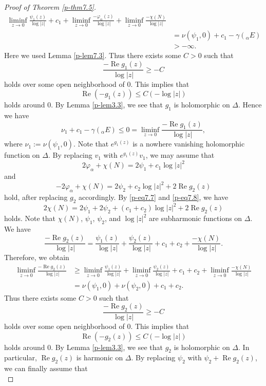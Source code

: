\documentclass[12pt,twoside]{amsart}
\DeclareMathOperator{\re}{Re}
\theoremstyle{definition}
\begin{document}
\begin{proof}[Proof of Theorem \ref{p-thm7.5}]
\[\begin{split}
\liminf_{z\to 0}\frac{\psi_1(z)}{\log |z|}
+c_1+\liminf_{z\to 0}\frac{-\varphi_\alpha(z)}{\log|z|}
+\liminf_{z\to 0}\frac{-\chi(N)}{\log|z|}
\\ &=\nu(\psi_1, 0)+c_1-\gamma({}_\alpha E) \\ 
&>-\infty. 
\end{split}
\] 
Here we used Lemma \ref{p-lem7.3}. 
Thus there exists some $C>0$ such that 
\[
\frac{-\re g_1(z)}{\log |z|}\geq -C
\] 
holds over some open neighborhood of $0$. 
This implies that 
\[
\re\left(-g_1(z)\right)\leq C\left(-\log |z|\right)
\] 
holds around $0$. 
By Lemma \ref{p-lem3.3}, we see that 
$g_1$ is holomorphic on $\Delta$. 
Hence we have 
\[\nu_1+c_1-\gamma ({}_\alpha E)\leq 0=\liminf_{z\to 0} \frac{-\re g_1(z)}{\log |z|}, 
\] 
where $\nu_1:=\nu(\psi_1, 0)$. 
Note that $e^{g_1(z)}$ is a nowhere vanishing holomorphic 
function on $\Delta$. 
By replacing $v_1$ with $e^{g_1(z)}v_1$,  
we may assume that
\begin{equation}\label{p-eq7.7}
2\varphi_\alpha + \chi(N) = 2\psi_1 + c_1 \log |z|^2
\end{equation}
and
\begin{equation}\label{p-eq7.8}
-2\varphi_\alpha + \chi(N) = 2\psi_2 + c_2 \log |z|^2 + 2\re g_2(z)
\end{equation}
hold, after replacing $g_2$ accordingly. 
By \eqref{p-eq7.7} and \eqref{p-eq7.8}, we have 
\[
2\chi (N)=2\psi_1+2\psi_2+(c_1+c_2)\log |z|^2+2\re g_2(z) 
\] 
holds. 
Note that $\chi(N)$, $\psi_1$, $\psi_2$, and $\log |z|^2$ are subharmonic 
functions on $\Delta$. 
We have 
\[
\frac{-\re g_2(z)}{\log |z|}=\frac{\psi_1(z)}{\log |z|}
+\frac{\psi_2(z)}{\log |z|}+c_1+c_2
+\frac{-\chi(N)}{\log|z|}. 
\] 
Therefore, we obtain 
\[
\begin{split}
\liminf_{z\to 0}\frac{-\re g_2(z)}{\log |z|}&\geq 
\liminf_{z\to 0}\frac{\psi_1(z)}{\log |z|}
+\liminf_{z\to 0}\frac{\psi_2(z)}{\log |z|}
+c_1+c_2
+\liminf_{z\to 0}\frac{-\chi(N)}{\log|z|}
\\ &=\nu(\psi_1, 0)+\nu(\psi_2, 0)+c_1+c_2. 
\end{split}
\] 
Thus there exists some $C>0$ such that 
\[
\frac{-\re g_2(z)}{\log |z|}\geq -C
\] 
holds over some open neighborhood of $0$. 
This implies that 
\[
\re\left(-g_2(z)\right)\leq C\left(-\log |z|\right)
\] 
holds around $0$. 
By Lemma \ref{p-lem3.3}, we see that 
$g_2$ is holomorphic on $\Delta$. 
In particular, $\re g_2(z)$ is harmonic on $\Delta$. 
By replacing $\psi_2$ with $\psi_2 +\re g_2(z)$, we can finally assume that 
\begin{equation}\label{p-eq7.9}

\end{equation}
\end{proof}
\end{document}
